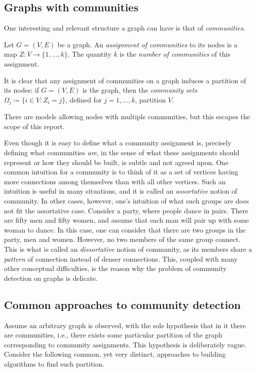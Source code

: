 \documentclass[../../main.tex]{subfiles} %
\begin{document}
\subsection{Graphs with communities}
One interesting and relevant structure a graph can have is that of 
\textit{communities}. 

\begin{definition}
	Let \(G = (V, E)\) be a graph. An \textit{assignment of communities} to its 
	nodes is a map \(Z: V \to \{1, \dots, k\}\). The quantity \(k\) is the 
	\textit{number of communities} of this assignment.
\end{definition}

It is clear that any assignment of communities on a graph induces a 
partition of 
its nodes: if \(G = (V, E)\) is the graph, then the \textit{community sets} 
\(\Omega_j \coloneqq \{i \in V : Z_i = j\}\), defined for \(j = 1, \dots, k\), 
partition \(V\).
\begin{remark}
	There are models allowing nodes with multiple communities, but this 
	escapes the scope of this report.
\end{remark}

Even though it is easy to define what a community assignment is, precisely 
defining what communities \textit{are}, in the sense of what these 
assignments 
should represent or how they should be built, is subtle and not agreed 
upon. 
One common intuition for a community is to think of it as a set of vertices 
having more connections among themselves than with all other vertices. 
Such 
an intuition is useful in many situations, and it is called an 
\textit{assortative} 
notion of community. In other cases, however, one's intuition of what such 
groups are does not fit the assortative case. Consider a party, where people 
dance in pairs. There are fifty men and fifty women, and assume that each 
man 
will pair up with some woman to dance. In this case, one can consider that 
there 
are two groups in the party, men and women. However, no two members of 
the 
same group connect. This is what is called an \textit{dissortative} notion of 
community, as its members share a \textit{pattern} of connection instead of 
denser connections. This, coupled with many other conceptual difficulties, is 
the reason why the problem of community detection on graphs is delicate.

\subsection{Common approaches to community detection}
Assume an arbitrary graph is observed, with the sole hypothesis that in it 
there are communities, i.e., there exists some particular partition of the 
graph corresponding to community assignments. This hypothesis is deliberately 
vague. Consider the following common, yet very distinct, approaches to 
building algorithms to find such partition.
\end{document}
